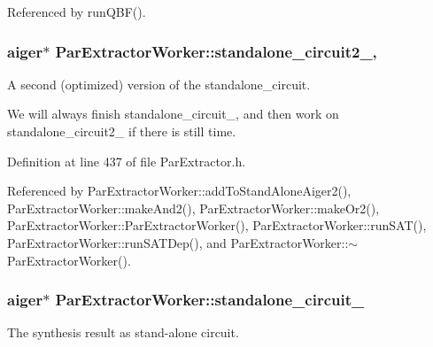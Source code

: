 Referenced by run\-Q\-B\-F().

\hypertarget{classParExtractorWorker_a304c66039a45652e273876f7c6da8bcf}{
\subsubsection[{standalone\-\_\-circuit2\-\_\-}]{\setlength{\rightskip}{0pt plus 5cm}aiger$\ast$ Par\-Extractor\-Worker\-::standalone\-\_\-circuit2\-\_\-\hspace{0.3cm}{\ttfamily [protected]}, {\ttfamily [inherited]}}}\label{classParExtractorWorker_a304c66039a45652e273876f7c6da8bcf}


A second (optimized) version of the standalone\-\_\-circuit. 

We will always finish standalone\-\_\-circuit\-\_\-, and then work on standalone\-\_\-circuit2\-\_\- if there is still time. 

Definition at line 437 of file Par\-Extractor.\-h.



Referenced by Par\-Extractor\-Worker\-::add\-To\-Stand\-Alone\-Aiger2(), Par\-Extractor\-Worker\-::make\-And2(), Par\-Extractor\-Worker\-::make\-Or2(), Par\-Extractor\-Worker\-::\-Par\-Extractor\-Worker(), Par\-Extractor\-Worker\-::run\-S\-A\-T(), Par\-Extractor\-Worker\-::run\-S\-A\-T\-Dep(), and Par\-Extractor\-Worker\-::$\sim$\-Par\-Extractor\-Worker().

\hypertarget{classParExtractorWorker_a233a7f99946695b0640e76ead6932fbb}{
\subsubsection[{standalone\-\_\-circuit\-\_\-}]{\setlength{\rightskip}{0pt plus 5cm}aiger$\ast$ Par\-Extractor\-Worker\-::standalone\-\_\-circuit\-\_\-\hspace{0.3cm}{\ttfamily [inherited]}}}\label{classParExtractorWorker_a233a7f99946695b0640e76ead6932fbb}


The synthesis result as stand-\/alone circuit. 

